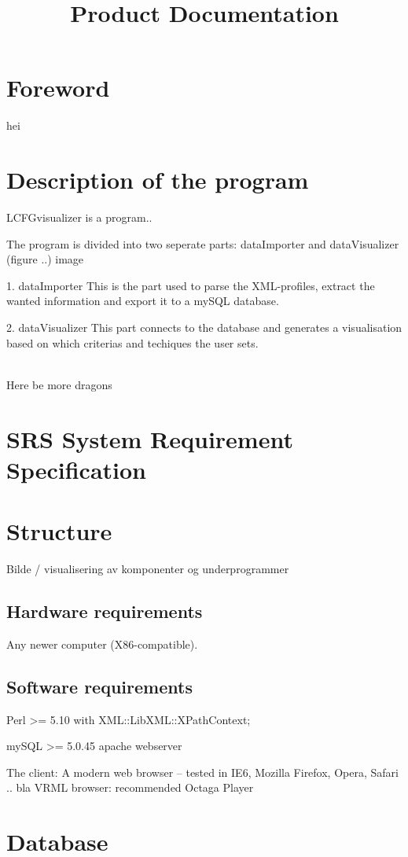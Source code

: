 \documentclass[12pt,a4paper]{report}
\title{Product Documentation}
\begin{document}
\section*{Foreword}
hei
\section*{Description of the program}

LCFGvisualizer is a program..

The program is divided into two seperate parts:
dataImporter and dataVisualizer (figure ..) image

1. dataImporter
This is the part used to parse the XML-profiles, extract the wanted information and export it to a mySQL database. 

2. dataVisualizer
This part connects to the database and generates a visualisation based on which criterias and techiques the user sets.


\\
Here be more dragons

\section*{SRS System Requirement Specification}
\section*{Structure}
	Bilde / visualisering av komponenter og underprogrammer 
	\subsection*{Hardware requirements}
	
	Any newer computer (X86-compatible).

	\subsection*{Software requirements}

	
	Perl >= 5.10 with XML::LibXML::XPathContext;
		
	mySQL >= 5.0.45
	apache webserver
	
	The client:
	A modern web browser -- tested in IE6, Mozilla Firefox, Opera, Safari .. bla
	VRML browser: recommended Octaga Player 
	
	
	

\section*{Database}
\end{document}
